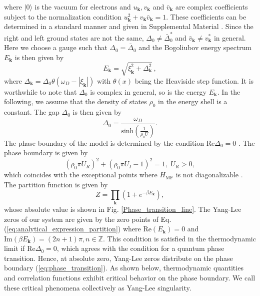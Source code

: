 \documentclass[aps,prl,twocolumn,nofootinbib,superscriptaddress,longbibliography]{revtex4-1}
\begin{document}
	where $|0\rangle$ is the vacuum for electrons and $u_{\bm{k}},v_{\bm{k}}$ and $\bar{v}_{\bm{k}}$ are complex coefficients subject to the normalization condition $u_{\bm{k}}^2+v_{\bm{k}}\bar{v}_{\bm{k}}=1$. These coefficients can be determined in a standard manner and given in Supplemental Material \cite{SupplementaryMaterial}. Since the right and left ground states are not the same, $\Delta_0\neq \bar{\Delta}_{0}^*$ and $\bar{v}_{\bm{k}}\neq v_{\bm{k}}^*$ in general. Here we choose a gauge such that $\Delta_0=\bar{\Delta}_0$ and the Bogoliubov energy spectrum $E_{\bm{k}}$ is then given by \cite{Yamamoto2019}
	\begin{equation}
		E_{\bm{k}}=\sqrt{\xi_{\bm{k}}^2+\Delta_{\bm{k}}^2}\,,
	\end{equation} 
where $\Delta_{\bm{k}}=\Delta_0\theta(\omega_D-|\xi_{\bm{k}}|)$ with $\theta(x)$ being the Heaviside step function. It is worthwhile to note that $\Delta_0$ is complex in general, so is the energy $E_{\bm{k}}$. In the following, we assume that the density of states $\rho_{0}$ in the energy shell is a constant. The gap $\Delta_0$ is then given by 
	\begin{equation}
		\Delta_0 =
		\frac{\omega_D}{\text{sinh} \left( \frac{1}{\rho_0 U}\right)}.\label{eq:gap}
	\end{equation}
	The phase boundary of the model is determined by the condition $\text{Re}\Delta_0=0$ \cite{Yamamoto2019}. The phase boundary is given by
	\begin{equation}
	(\rho_{0}\pi U_{R})^{2}+(\rho_{0}\pi U_I-1)^{2}=1,\;U_{R}>0,\label{eq:phase_transition}
	\end{equation}
	 which coincides with the exceptional points where $H_{\mathrm{MF}}$ is not diagonalizable \cite{Yamamoto2019}. The partition function is given by
	\begin{equation}
	Z=\prod_{\bm{k}}(1+e^{-\beta E_{\bm{k}}}),\label{eq:analytical_expression_partition}
	\end{equation}
	whose absolute value is shown in Fig. \ref{Phase_transition_line}. 
	The Yang-Lee
	zeros of our system are given by the zero points of Eq. (\ref{eq:analytical_expression_partition}) %
	where $\mathrm{Re}(E_{\bm{k}})=0$
	and $\mathrm{Im}(\beta E_{\bm{k}})=(2n+1)\pi,n\in\mathbb{Z}$. This condition is satisfied in the thermodynamic limit if $\mathrm{Re}\Delta_0=0$, which agrees with the condition for a quantum phase transition. Hence, at absolute zero, Yang-Lee zeros distribute on the phase boundary (\ref{eq:phase_transition}). As shown below, thermodynamic quantities and correlation functions exhibit critical behavior on the phase boundary. We call these critical phenomena collectively as Yang-Lee singularity. 
	
\end{document}
